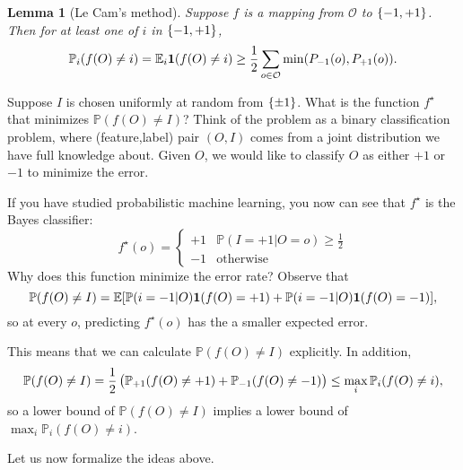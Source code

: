 \documentclass{article}
\newtheorem{lemma}{Lemma}
\newtheorem{definition}{Definition}
\newcommand{\EE}{\mathbb{E}}
\newcommand{\PP}{\mathbb{P}}
\newcommand{\Ocal}{\mathcal{O}}
\newcommand{\defeq}{\triangleq}
\newcommand*{\one}{{\bf 1}}
\begin{document}

\begin{lemma}[Le Cam's method]
Suppose $f$ is a mapping from $\Ocal$ to $\cbr{-1,+1}$. Then for at least one of
$i$ in $\cbr{-1,+1}$,
\[ \PP_i(f(O) \neq i) = \EE_i \one(f(O) \neq i) \geq \frac12\sum_{o \in \Ocal} \min(P_{-1}(o), P_{+1}(o)). \]
\label{lem:lecam}
\end{lemma}


Suppose $I$ is chosen uniformly at random from $\cbr{\pm 1}$.
What is the function $f^\star$ that minimizes $\PP(f(O) \neq I)$? Think of the problem
as a binary classification problem, where (feature,label) pair $(O,I)$ comes from a joint distribution we have full knowledge about. Given $O$, we would like to classify $O$ as either $+1$ or $-1$ to minimize the error.

If you have studied probabilistic machine learning, you now can see that $f^\star$ is the Bayes classifier:
\[ f^\star(o) = \begin{cases} +1 & \PP(I = +1|O=o) \geq \frac12 \\ -1 & \text{otherwise} \end{cases} \]
Why does this function minimize the error rate? Observe that
\[ \PP(f(O) \neq I)
  = \EE[ \PP(i=-1|O) \one(f(O) = +1) + \PP(i=-1|O) \one(f(O) = -1)], \]
so at every $o$, predicting $f^\star(o)$ has the a smaller expected error.

This means that we can calculate $\PP(f(O) \neq I)$ explicitly. In addition,
\begin{equation}
  \PP(f(O) \neq I) = \frac12 \del{\PP_{+1}(f(O) \neq +1) + \PP_{-1}(f(O) \neq -1)}
\leq \max_i \PP_{i}(f(O) \neq i),
\label{eqn:avg-worst}
\end{equation}
so a lower bound of $\PP(f(O) \neq I)$ implies a lower bound of $\max_i \PP_{i}(f(O) \neq i)$.

Let us now formalize the ideas above.
\end{document}
